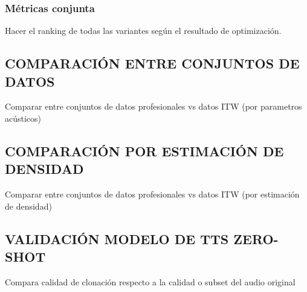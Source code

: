 \subsubsection{Métricas conjunta}
Hacer el ranking de todas las variantes según el resultado de optimización.

\subsection{COMPARACIÓN ENTRE CONJUNTOS DE DATOS}
Comparar entre conjuntos de datos profesionales vs datos ITW (por parametros acústicos)

\subsection{COMPARACIÓN POR ESTIMACIÓN DE DENSIDAD}
Comparar entre conjuntos de datos profesionales vs datos ITW (por estimación de densidad)

\subsection{VALIDACIÓN MODELO DE TTS ZERO-SHOT}
Compara calidad de clonación respecto a la calidad o subset del audio original
